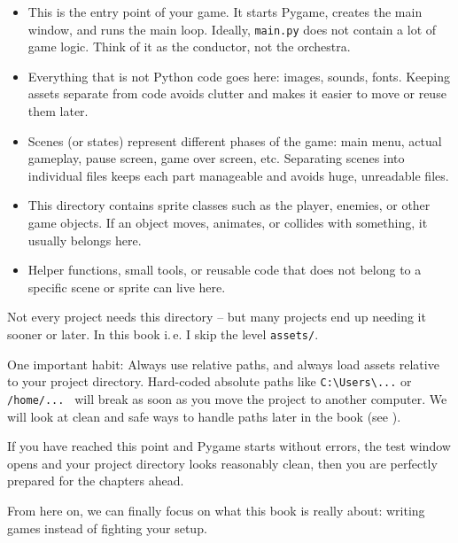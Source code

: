 \begin{itemize}
	\item[\texttt{main.py}] This is the entry point of your game. It starts Pygame, creates the main window, and runs the main loop. Ideally, \texttt{main.py} does not contain a lot of game logic. Think of it as the conductor, not the orchestra.
	
	\item[\texttt{assets/}] Everything that is not Python code goes here: images, sounds, fonts.	Keeping assets separate from code avoids clutter and makes it easier to move or reuse them later.
	
	\item[\texttt{scenes/}] Scenes (or states) represent different phases of the game: main menu, actual gameplay, pause screen, game over screen, etc. Separating scenes into individual files keeps each part manageable and avoids huge, unreadable files.
	
	\item[\texttt{sprites/}] This directory contains sprite classes such as the player, enemies, or other game objects.	If an object moves, animates, or collides with something, it usually belongs here.
	
	\item[\texttt{utils/}] Helper functions, small tools, or reusable code that does not belong to a specific scene or sprite can live here.
\end{itemize}


Not every project needs this directory -- but many projects end up needing it sooner or later. In this book i.\,e. I skip the level \texttt{assets/}.

\begin{warningbox}
	One important habit: Always use relative paths, and always load assets relative to your project directory. Hard-coded absolute paths like \verb+C:\Users\...+ or \verb+/home/... +	will break as soon as you move the project to another computer. We will look at clean and safe ways to handle paths later in the book (see ).
\end{warningbox}



If you have reached this point and Pygame starts without errors, the test window opens and your project directory looks reasonably clean, then you are perfectly prepared for the chapters ahead.

From here on, we can finally focus on what this book is really about: writing games instead of fighting your setup.


